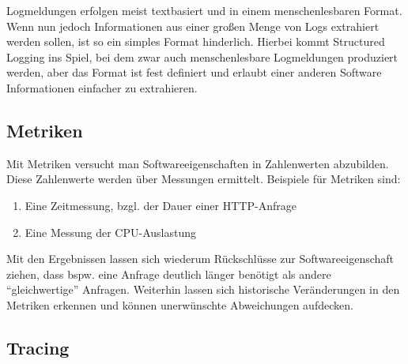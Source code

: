%

Logmeldungen erfolgen meist textbasiert und in einem menschenlesbaren Format. Wenn nun jedoch Informationen aus einer großen Menge von Logs extrahiert werden sollen, ist so ein simples Format hinderlich. Hierbei kommt Structured Logging ins Spiel, bei dem zwar auch menschenlesbare Logmeldungen produziert werden, aber das Format ist fest definiert und erlaubt einer anderen Software Informationen einfacher zu extrahieren.

\subsection{Metriken}

Mit Metriken versucht man Softwareeigenschaften in Zahlenwerten abzubilden. Diese Zahlenwerte werden über Messungen ermittelt. Beispiele für Metriken sind:

\begin{enumerate}
	\item Eine Zeitmessung, bzgl. der Dauer einer HTTP-Anfrage
	\item Eine Messung der CPU-Auslastung
\end{enumerate}


Mit den Ergebnissen lassen sich wiederum Rückschlüsse zur Softwareeigenschaft ziehen, dass bspw. eine Anfrage deutlich länger benötigt als andere \enquote{gleichwertige} Anfragen. Weiterhin lassen sich historische Veränderungen in den Metriken erkennen und können unerwünschte Abweichungen aufdecken.

\subsection{Tracing}
\label{sec:tracing}

